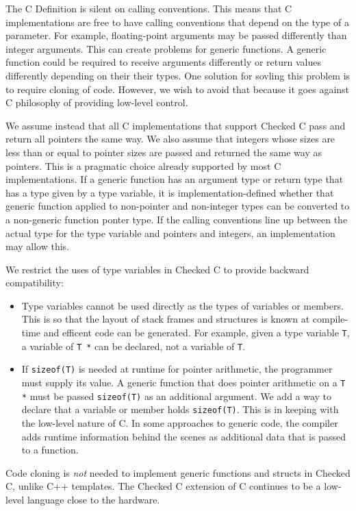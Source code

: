 The C Definition is silent on calling conventions.  This means that C implementations
are free to have calling conventions that depend on the type of a parameter.
For example, floating-point arguments may be passed differently than integer 
arguments.
This can create problems for generic functions.  A generic
function could be required to receive arguments differently or return
values differently depending on their their types.  One solution for
sovling this problem is to require cloning of code.  However, we wish to avoid
that because it goes against C philosophy of providing low-level control.

We assume instead that all C implementations that support Checked C pass and
return all pointers the same way.  We also assume that integers whose sizes are less
than or equal to pointer sizes are passed and returned the same way as pointers.  This
is a pragmatic choice already supported by most C implementations.  If a generic
function has an argument type or return type that has a type given by a type
variable, it is implementation-defined whether that generic function applied to
non-pointer and non-integer types can be converted to a non-generic function
ponter type. If the calling conventions line up between the actual type for
the type variable and pointers and integers, an implementation may allow this.

We restrict the uses of type variables in Checked C to provide
backward compatibility:
\begin{itemize}
\item Type variables cannot be used directly as the types of variables or members.
This is so that the layout of stack frames and structures is known at compile-time 
and efficent code can be generated.  For example, given a type variable \lstinline+T+, 
a variable of \lstinline+T *+ can be declared, not a variable of \lstinline+T+.  
\item If \lstinline+sizeof(T)+ is needed at runtime for pointer arithmetic,
the programmer must supply its value.  A generic
function that does pointer arithmetic on a \lstinline+T *+ must be passed 
\lstinline+sizeof(T)+ as an additional argument.  We add a way to declare that
a variable or member holds \lstinline+sizeof(T)+.
This is in keeping with the low-level nature of C.
In some approaches to generic code, the compiler adds runtime information behind the scenes 
as additional data that is passed to a function. 
\end{itemize}
Code cloning is {\em not} needed to
implement generic functions and structs in Checked C, unlike C++ templates.
The Checked C extension of C continues to be a low-level language close
to the hardware.

